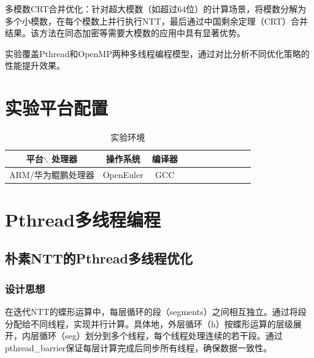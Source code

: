 \documentclass[a4paper]{article}
\begin{document}
多模数CRT合并优化：针对超大模数（如超过64位）的计算场景，将模数分解为多个小模数，在每个模数上并行执行NTT，最后通过中国剩余定理（CRT）合并结果。该方法在同态加密等需要大模数的应用中具有显著优势。

实验覆盖Pthread和OpenMP两种多线程编程模型，通过对比分析不同优化策略的性能提升效果。
\section{实验平台配置}
\begin{table}[!htbp]
	\centering
	\begin{tabular}{ccccccccccc}
		\toprule  
		平台$\backslash$ 处理器& 操作系统& 编译器\\
		\midrule
		ARM/华为鲲鹏处理器& OpenEuler& GCC\\
		\bottomrule
	\end{tabular}
	\caption{实验环境}
	\label{table:t1}
\end{table}
\section{Pthread多线程编程}
\subsection{朴素NTT的Pthread多线程优化}
\subsubsection{设计思想}
在迭代NTT的蝶形运算中，每层循环的段（segments）之间相互独立。通过将段分配给不同线程，实现并行计算。具体地，外层循环（h）按蝶形运算的层级展开，内层循环（seg）划分到多个线程，每个线程处理连续的若干段。通过pthread\_barrier保证每层计算完成后同步所有线程，确保数据一致性。
\end{document}

